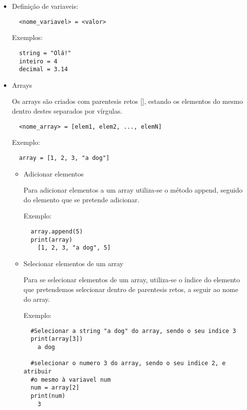 \documentclass{article}
\begin{document}
  \begin{itemize}
  \item Defini\c c\~ao de variaveis:
  
  \begin{lstlisting}
  <nome_variavel> = <valor>
  \end{lstlisting}
  
  Exemplos:
  
  \begin{lstlisting}
  string = "Olá!"
  inteiro = 4
  decimal = 3.14
  \end{lstlisting}
  
  \item Arrays
  
  Os arrays s\~ao criados com parentesis retos [], estando os elementos do mesmo dentro destes separados por v\'irgulas.
  
  \begin{lstlisting}
  <nome_array> = [elem1, elem2, ..., elemN]
  \end{lstlisting}
  
  Exemplo:
  
  \begin{lstlisting}
  array = [1, 2, 3, "a dog"]
  \end{lstlisting}
  
  \begin{itemize}
  \item Adicionar elementos
  
  Para adicionar elementos a um array utiliza-se o m\'etodo append, seguido do elemento que se pretende adicionar.
  
  Exemplo:
  
  \begin{lstlisting}
  array.append(5)
  print(array)
    [1, 2, 3, "a dog", 5]
  \end{lstlisting}
  
  \item Selecionar elementos de um array
  
  Para se selecionar elementos de um array, utiliza-se o \'indice do elemento que pretendemos selecionar dentro de parentesis retos, a seguir ao nome do array.
  
  Exemplo:
  
  \begin{lstlisting}
  #Selecionar a string "a dog" do array, sendo o seu indice 3
  print(array[3])
  	a dog
  	
  #selecionar o numero 3 do array, sendo o seu indice 2, e atribuir 
  #o mesmo à variavel num
  num = array[2]
  print(num)
  	3
  \end{lstlisting}
  

\end{itemize}
\end{itemize}
\end{document}
